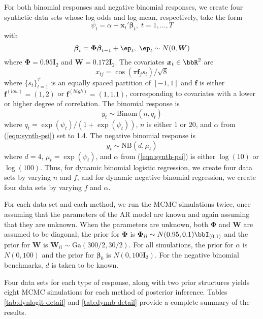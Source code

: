 \documentclass[12pt]{article}
\newcommand{\Ga}{\text{Ga}}
\newcommand{\bbeta}{\boldsymbol{\beta}}
\newcommand{\vx}{\boldsymbol{x}}
\newcommand{\bW}{\boldsymbol{W}}
\newcommand{\bPhi}{\boldsymbol{\Phi}}
\newcommand{\bI}{\boldsymbol{I}}
\newcommand{\vf}{\boldsymbol{f}}
\begin{document}
For both binomial responses and negative binomial responses, we create four
synthetic data sets whose log-odds and log-mean, respectively, take the form
\begin{equation}
  \label{eqn:synth-psi}
  \psi_t = \alpha + \vx_t' \bbeta_t, \; t = 1, \ldots, T
\end{equation}
with
\[
\bbeta_t = \bPhi \bbeta_{t-1} + \ep_t, \; \ep_t \sim N(0, \bW)
\]
where $\bPhi = 0.95 \bI_2$ and $\bW = 0.172 \bI_2$.  The covariates $\vx_t \in
\bbR^2$ are
\[
x_{tj} = \cos(\pi \vf_j s_t) / \sqrt{8}
\]
where $\{s_t\}_{t=1}^T$ is an equally spaced partition of $[-1,1]$ and $\vf$ is
either $\vf^{(low)} = (1,2)$ or $\vf^{(high)} = (1,1.1)$, corresponding to
covariates with a lower or higher degree of correlation.  The binomial response
is
\[
y_t \sim \text{Binom}(n, q_t)
\]
where $q_t = \exp({\psi_t}) / (1+\exp({\psi_t}))$, $n$ is either $1$ or $20$,
and $\alpha$ from (\ref{eqn:synth-psi}) set to 1.4.  The negative binomial
response is
\[
y_t \sim \text{NB}(d, \mu_t)
\]
where $d=4$, $\mu_t = \exp({\psi_t})$, and $\alpha$ from (\ref{eqn:synth-psi})
is either $\log(10)$ or $\log(100)$.  Thus, for dynamic binomial logistic
regression, we create four data sets by varying $n$ and $f$, and for dynamic
negative binomial regression, we create four data sets by varying $f$ and
$\alpha$.

For each data set and each method, we run the MCMC simulations twice, once
assuming that the parameters of the AR model are known and again assuming that
they are unknown.  When the parameters are unknown, both $\bPhi$ and $\bW$ are
assumed to be diagonal; the prior for $\bPhi$ is $\bPhi_{ii} \sim N(0.95, 0.1)
\bbI_{(0,1)}$ and the prior for $\bW$ is $\bW_{ii} \sim \Ga(300/2, 30/2)$.  For
all simulations, the prior for $\alpha$ is $N(0, 100)$ and the prior for
$\bbeta_0$ is $N(0, 100 \bI_2)$.  For the negative binomial benchmarks, $d$ is
taken to be known.

Four data sets for each type of response, along with two prior structures yields
eight MCMC simulations for each method of posterior inference.  Tables
\ref{tab:dynlogit-detail} and \ref{tab:dynnb-detail} provide a complete summary
of the results.

\end{document}
